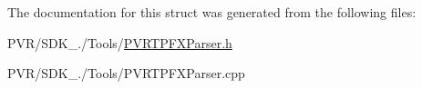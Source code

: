 The documentation for this struct was generated from the following files\+:\begin{DoxyCompactItemize}
\item 
P\+V\+R/\+S\+D\+K\+\_./\+Tools/\hyperlink{_p_v_r_t_p_f_x_parser_8h}{P\+V\+R\+T\+P\+F\+X\+Parser.\+h}\item 
P\+V\+R/\+S\+D\+K\+\_./\+Tools/P\+V\+R\+T\+P\+F\+X\+Parser.\+cpp\end{DoxyCompactItemize}
